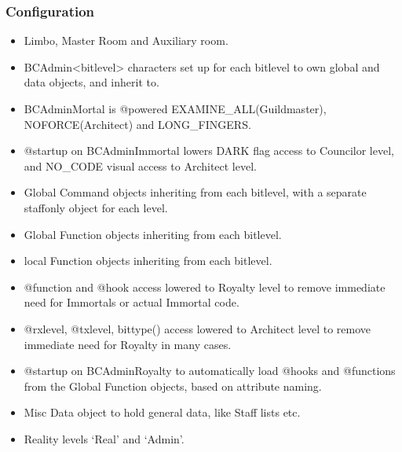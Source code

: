 \documentclass[letterpaper,10pt,english]{sphinxmanual}
\begin{document}
\subsubsection{Configuration}
\label{\detokenize{gettingstarted:configuration}}\begin{itemize}
\item {} 
\sphinxAtStartPar
Limbo, Master Room and Auxiliary room.

\item {} 
\sphinxAtStartPar
BC\sphinxhyphen{}Admin\sphinxhyphen{}\textless{}bitlevel\textgreater{} characters set up for each bitlevel to own global and
data objects, and inherit to.

\item {} 
\sphinxAtStartPar
BC\sphinxhyphen{}Admin\sphinxhyphen{}Mortal is @powered EXAMINE\_ALL(Guildmaster), NOFORCE(Architect) and
LONG\_FINGERS.

\item {} 
\sphinxAtStartPar
@startup on BC\sphinxhyphen{}Admin\sphinxhyphen{}Immortal lowers DARK flag access to Councilor level, and
NO\_CODE visual access to Architect level.

\item {} 
\sphinxAtStartPar
Global Command objects inheriting from each bitlevel, with a separate staff\sphinxhyphen{}only object for each level.

\item {} 
\sphinxAtStartPar
Global Function objects inheriting from each bitlevel.

\item {} 
\sphinxAtStartPar
local Function objects inheriting from each bitlevel.

\item {} 
\sphinxAtStartPar
@function and @hook access lowered to Royalty level to remove immediate need
for Immortals or actual Immortal code.

\item {} 
\sphinxAtStartPar
@rxlevel, @txlevel, bittype() access lowered to Architect level to remove
immediate need for Royalty in many cases.

\item {} 
\sphinxAtStartPar
@startup on BC\sphinxhyphen{}Admin\sphinxhyphen{}Royalty to automatically load @hooks and @functions from
the Global Function objects, based on attribute naming.

\item {} 
\sphinxAtStartPar
Misc Data object to hold general data, like Staff lists etc.

\item {} 
\sphinxAtStartPar
Reality levels ‘Real’ and ‘Admin’.

\end{itemize}
\end{document}
